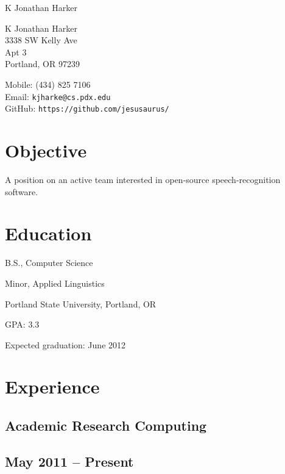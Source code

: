 \documentclass[10pt,letterpaper]{article}
\def\name{K Jonathan Harker}
\renewenvironment{itemize}{
  \begin{list}{}{
    \setlength{\leftmargin}{1.5em}
    \setlength{\itemsep}{0em}
    \setlength{\parskip}{0pt}
    \setlength{\parsep}{0em}
  }
}{
  \end{list}
}
\begin{document}
{\huge \name}


\vspace{0.25in}

\begin{minipage}[t]{0.5\textwidth}
  K Jonathan Harker\\
  3338 SW Kelly Ave\\
  Apt 3\\
  Portland, OR  97239
\end{minipage}
\begin{minipage}[t]{0.5\textwidth}
  Mobile: (434) 825 7106\\
  Email: \texttt{kjharke@cs.pdx.edu} \\
  GitHub: \texttt{https://github.com/jesusaurus/}\\
  
\end{minipage}

\section*{Objective}

A position on an active team interested in open-source speech-recognition software.

\section*{Education}

\begin{itemize}

  \item B.S., Computer Science
  \item Minor, Applied Linguistics
  \item Portland State University, Portland, OR
  \item GPA: 3.3
  \item Expected graduation: June 2012
  
\end{itemize}

\section*{Experience}

\begin{minipage}[t]{0.5\textwidth}
	\subsection*{Academic Research Computing}
\end{minipage}
\begin{minipage}[t]{0.5\textwidth}
	\subsection*{May 2011 -- Present}
\end{minipage}
\end{document}
